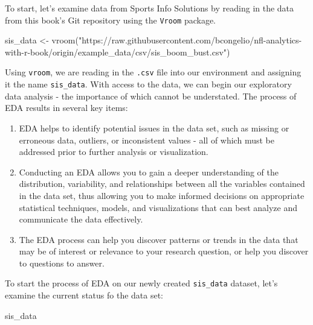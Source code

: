 \documentclass[
  letterpaper,
]{krantz}
\newenvironment{Shaded}{\begin{snugshade}}{\end{snugshade}}
\newcommand{\FunctionTok}[1]{\textcolor[rgb]{0.28,0.35,0.67}{#1}}
\newcommand{\NormalTok}[1]{\textcolor[rgb]{0.00,0.23,0.31}{#1}}
\newcommand{\OtherTok}[1]{\textcolor[rgb]{0.00,0.23,0.31}{#1}}
\newcommand{\StringTok}[1]{\textcolor[rgb]{0.13,0.47,0.30}{#1}}
\providecommand{\tightlist}{%
  \setlength{\itemsep}{0pt}\setlength{\parskip}{0pt}}\usepackage{longtable,booktabs,array}
\begin{document}
To start, let's examine data from Sports Info Solutions by reading in
the data from this book's Git repository using the \texttt{Vroom}
package.

\begin{Shaded}
\begin{Highlighting}[]
\NormalTok{sis\_data }\OtherTok{\textless{}{-}}
  \FunctionTok{vroom}\NormalTok{(}\StringTok{"https://raw.githubusercontent.com/bcongelio/nfl{-}analytics{-}with{-}r{-}book/origin/example\_data/csv/sis\_boom\_bust.csv"}\NormalTok{)}
\end{Highlighting}
\end{Shaded}

Using \texttt{vroom}, we are reading in the \texttt{.csv} file into our
environment and assigning it the name \texttt{sis\_data}. With access to
the data, we can begin our exploratory data analysis - the importance of
which cannot be understated. The process of EDA results in several key
items:

\begin{enumerate}
\def\labelenumi{\arabic{enumi}.}
\tightlist
\item
  EDA helps to identify potential issues in the data set, such as
  missing or erroneous data, outliers, or inconsistent values - all of
  which must be addressed prior to further analysis or visualization.
\item
  Conducting an EDA allows you to gain a deeper understanding of the
  distribution, variability, and relationships between all the variables
  contained in the data set, thus allowing you to make informed
  decisions on appropriate statistical techniques, models, and
  visualizations that can best analyze and communicate the data
  effectively.
\item
  The EDA process can help you discover patterns or trends in the data
  that may be of interest or relevance to your research question, or
  help you discover to questions to answer.
\end{enumerate}

To start the process of EDA on our newly created \texttt{sis\_data}
dataset, let's examine the current status fo the data set:

\begin{Shaded}
\begin{Highlighting}[]
\NormalTok{sis\_data}
\end{Highlighting}
\end{Shaded}
\end{document}
